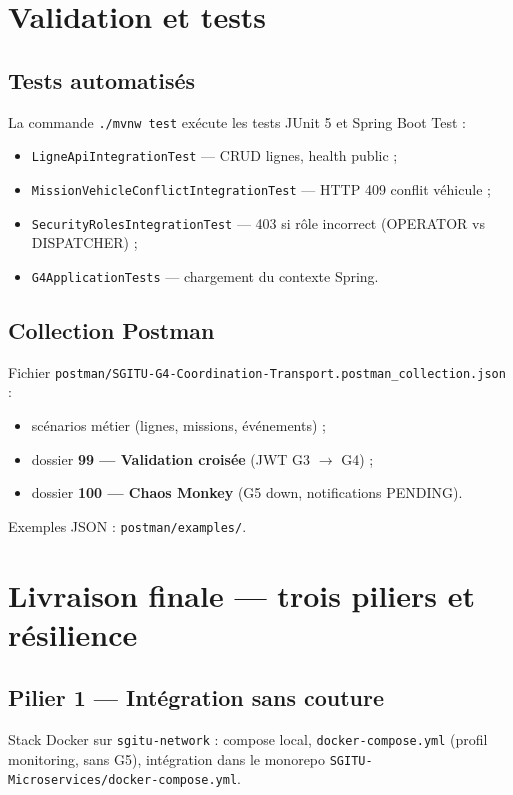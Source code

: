 \documentclass[12pt,a4paper]{report}
\begin{document}
\chapter{Validation et tests}

\section{Tests automatisés}
La commande \texttt{./mvnw test} exécute les tests JUnit 5 et Spring Boot Test :
\begin{itemize}
    \item \texttt{LigneApiIntegrationTest} — CRUD lignes, health public ;
    \item \texttt{MissionVehicleConflictIntegrationTest} — HTTP 409 conflit véhicule ;
    \item \texttt{SecurityRolesIntegrationTest} — 403 si rôle incorrect (OPERATOR vs DISPATCHER) ;
    \item \texttt{G4ApplicationTests} — chargement du contexte Spring.
\end{itemize}

\section{Collection Postman}
Fichier \texttt{postman/SGITU-G4-Coordination-Transport.postman\_collection.json} :
\begin{itemize}
    \item scénarios métier (lignes, missions, événements) ;
    \item dossier \textbf{99 — Validation croisée} (JWT G3 $\rightarrow$ G4) ;
    \item dossier \textbf{100 — Chaos Monkey} (G5 down, notifications PENDING).
\end{itemize}

Exemples JSON : \texttt{postman/examples/}.

\chapter{Livraison finale — trois piliers et résilience}

\section{Pilier 1 — Intégration sans couture}
Stack Docker sur \texttt{sgitu-network} : compose local, \texttt{docker-compose.yml} (profil monitoring, sans G5), intégration dans le monorepo \texttt{SGITU-Microservices/docker-compose.yml}.
\end{document}
